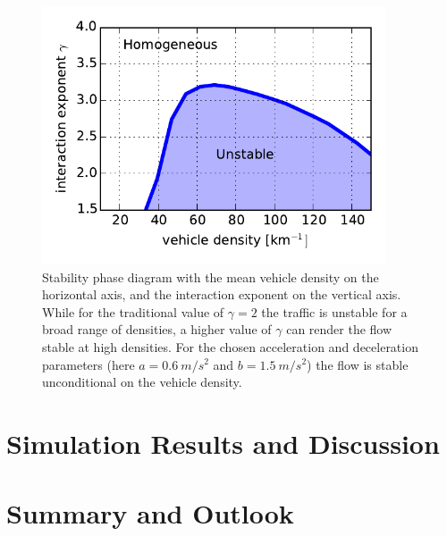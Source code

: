 \begin{figure}
    \centering
    \includegraphics[width=4in]{../img/phase_diagram.pdf}
    \caption{Stability phase diagram with the mean vehicle density on the horizontal axis, and the interaction exponent on the vertical axis. While for the traditional value of $\gamma=2$ the traffic is unstable for a broad range of densities, a higher value of $\gamma$ can render the flow stable at high densities. For the chosen acceleration and deceleration parameters (here $a=\SI{0.6}{m/s^2}$ and $b=\SI{1.5}{m/s^2}$) the flow is stable unconditional on the vehicle density.}
    \label{fig:phase_diagram}
\end{figure}
\clearpage


\section{Simulation Results and Discussion}

\section{Summary and Outlook}










  



 

